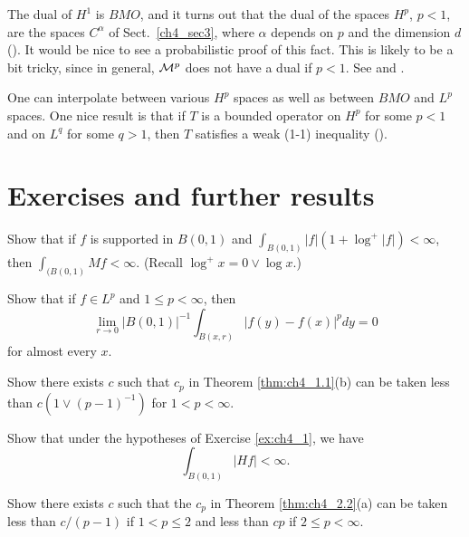 The dual of $H^1$ is $BMO$, and it turns out that the dual of the spaces $H^p$, $p < 1$, are the spaces $C^\alpha$ of Sect.\ \ref{ch4_sec3}, where $\alpha$ depends on $p$ and the dimension $d$ (\cite{FeffermanStein1972}). It would be nice to see a probabilistic proof of this fact. This is likely to be a bit tricky, since in general, $\mathcal{M}^p$ does not have a dual if $p < 1$. See \cite{Durrett1984} and \cite{Herz1974}.

One can interpolate between various $H^p$ spaces as well as between $BMO$ and $L^p$ spaces. One nice result is that if $T$ is a bounded operator on $H^p$ for some $p < 1$ and on $L^q$ for some $q > 1$, then $T$ satisfies a weak (1-1) inequality (\cite{FollandStein1982}).

\section{Exercises and further results}

\begin{exercise}\label{ex:ch4_1}
Show that if $f$ is supported in $B(0,1)$ and $\int_{B(0,1)} |f|(1 + \log^+ |f|) < \infty$, then $\int_{(B(0,1)} Mf < \infty$. (Recall $\log^+ x = 0 \vee \log x$.)
\end{exercise}

\begin{exercise}\label{ex:ch4_2}
Show that if $f \in L^p$ and $1 \leq p < \infty$, then
\[
    \lim_{r\to 0} |B(0,1)|^{-1} \int_{B(x,r)} |f(y) - f(x)|^p dy = 0
\]
for almost every $x$.
\end{exercise}

\begin{exercise}\label{ex:ch4_3}
Show there exists $c$ such that $c_p$ in Theorem \ref{thm:ch4_1.1}(b) can be taken less than $c(1 \vee (p-1)^{-1})$ for $1 < p < \infty$.
\end{exercise}

\begin{exercise}\label{ex:ch4_4}
Show that under the hypotheses of Exercise \ref{ex:ch4_1}, we have
\[
    \int_{B(0,1)} |Hf| < \infty.
\]
\end{exercise}

\mpagebreak

\begin{exercise}\label{ex:ch4_5}
Show there exists $c$ such that the $c_p$ in Theorem \ref{thm:ch4_2.2}(a) can be taken less than $c/(p-1)$ if $1 < p \leq 2$ and less than $cp$ if $2 \leq p < \infty$.
\end{exercise}

